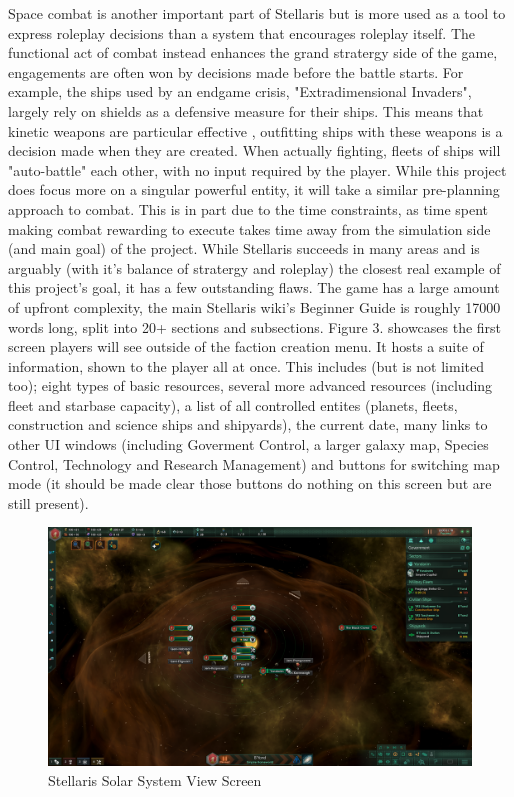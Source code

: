 \documentclass{report}
\begin{document}
Space combat is another important part of Stellaris but is more used as a tool to express roleplay decisions than a system that encourages roleplay itself. The functional act of combat instead enhances the grand stratergy side of the game, engagements are often won by decisions made before the battle starts. For example, the ships used by an endgame crisis, "Extradimensional Invaders", largely rely on shields as a defensive measure for their ships. This means that kinetic weapons are particular effective \cite{stellarisBattleDecision}, outfitting ships with these weapons is a decision made when they are created. When actually fighting, fleets of ships will "auto-battle" each other, with no input required by the player. While this project does focus more on a singular powerful entity, it will take a similar pre-planning approach to combat. This is in part due to the time constraints, as time spent making combat rewarding to execute takes time away from the simulation side (and main goal) of the project.
\newline
\newline
While Stellaris succeeds in many areas and is arguably (with it's balance of stratergy and roleplay) the closest real example of this project's goal, it has a few outstanding flaws. The game has a large amount of upfront complexity, the main Stellaris wiki's Beginner Guide \cite{stellarisBeginner} is roughly 17000 words long, split into 20+ sections and subsections. Figure 3. showcases the first screen players will see outside of the faction creation menu. It hosts a suite of information, shown to the player all at once. This includes (but is not limited too); eight types of basic resources, several more advanced resources (including fleet and starbase capacity), a list of all controlled entites (planets, fleets, construction and science ships and shipyards), the current date, many links to other UI windows (including Goverment Control, a larger galaxy map, Species Control, Technology and Research Management) and buttons for switching map mode (it should be made clear those buttons do nothing on this screen but are still present).

\begin{figure}[H]
    \includegraphics[width=\textwidth]{stellaris_main_screen.png}
    \caption{Stellaris Solar System View Screen}
\end{figure}
\end{document}
